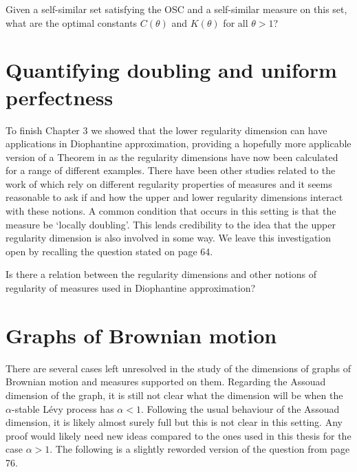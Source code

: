 \begin{question}
Given a self-similar set satisfying the OSC and a self-similar measure on this set, what are the optimal constants $C(\theta)$ and $K(\theta)$ for all $\theta > 1$?
\end{question}


\section{Quantifying doubling and uniform perfectness}\label{ch-conclusion:diophantine}

To finish Chapter 3 we showed that the lower regularity dimension can have applications in Diophantine approximation, providing a hopefully more applicable version of a Theorem in \cite{beres-sanju-al} as the regularity dimensions have now been calculated for a range of different examples. There have been other studies related to the work of \cite{beres-sanju-al} which rely on different regularity properties of measures and it seems reasonable to ask if and how the upper and lower regularity dimensions interact with these notions. A common condition that occurs in this setting is that the measure be `locally doubling'. This lends credibility to the idea that the upper regularity dimension is also involved in some way. We leave this investigation open by recalling the question stated on page 64.

\begin{question}
Is there a relation between the regularity dimensions and other notions of regularity of measures used in Diophantine approximation?
\end{question}


\section{Graphs of Brownian motion}\label{ch-conclusion:brownian}

There are several cases left unresolved in the study of the dimensions of graphs of Brownian motion and measures supported on them. Regarding the Assouad dimension of the graph, it is still not clear what the dimension will be when the $\alpha$-stable L\'evy process has $\alpha < 1$. Following the usual behaviour of the Assouad dimension, it is likely almost surely full but this is not clear in this setting. Any proof would likely need new ideas compared to the ones used in this thesis for the case $\alpha > 1$. The following is a slightly reworded version of the question from page 76.

